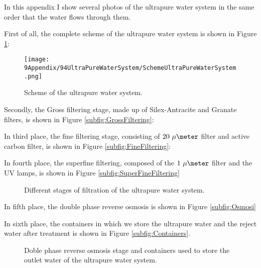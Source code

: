 In this appendix I show several photos of the ultrapure water system in the same order that the water flows through them.

First of all, the complete scheme of the ultrapure water system is shown in Figure \ref{fig:SchemeUPWS}:

\begin{figure}[htbp]
\centering
\texttt{[image: 9Appendix/94UltraPureWaterSystem/SchemeUltraPureWaterSystem.png]}
\caption{Scheme of the ultrapure water system.\label{fig:SchemeUPWS}}
\end{figure}

Secondly, the Gross filtering stage, made up of Silex-Antracite and Granate filters, is shown in Figure \ref{subfig:GrossFiltering}:

In third place, the fine filtering stage, consisting of $20~\mu\meter$ filter and active carbon filter, is shown in Figure \ref{subfig:FineFiltering}:

In fourth place, the superfine filtering, composed of the $1~\mu\meter$ filter and the UV lamps, is shown in Figure \ref{subfig:SuperFineFiltering}

\begin{figure}[htbp]
 \centering
 \caption{Different stages of filtration of the ultrapure water system.}
 \label{fig:UltraPureWaterStages}
\end{figure}

In fifth place, the double phase reverse osmosis is shown in Figure \ref{subfig:Osmosi}

In sixth place, the containers in which we store the ultrapure water and the reject water after treatment is shown in Figure \ref{subfig:Containers}.

\begin{figure}[htbp]
 \centering
 \caption{Doble phase reverse osmosis stage and containers used to store the outlet water of the ultrapure water system.}
 \label{subfig:OsmosisContainers}
\end{figure}

